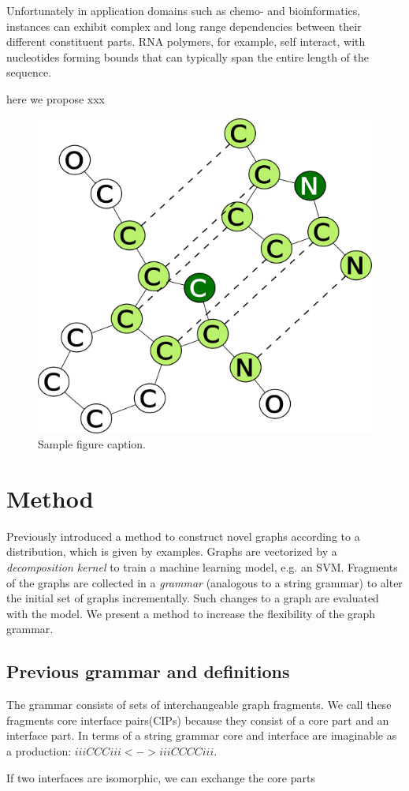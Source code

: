\documentclass{article}
\begin{document}
Unfortunately in application domains such as chemo- and bioinformatics,
instances can exhibit complex and long range dependencies between their
different constituent parts. RNA polymers, for example, self interact, with
nucleotides forming bounds that can typically span the entire length of the
sequence.

here we propose xxx

% 
\begin{figure}[ht]
      \centering
        \includegraphics[width=0.2\linewidth]{images/showcip.png}
      \caption{Sample figure caption.}
      \label{alabal}
\end{figure}

\section{Method}
Previously \cite{costa16} introduced a method
to construct novel graphs according to a distribution, which is given by
examples. Graphs are vectorized by a \emph{decomposition kernel}
to train a machine learning model, e.g. an SVM.
Fragments of the graphs are collected in 
a \emph{grammar} (analogous to a string grammar) to alter the initial
set of graphs incrementally. Such changes to a graph are evaluated with the
model. 
We present a method to increase the flexibility of the graph grammar.

\subsection{Previous grammar and definitions}

The grammar consists of sets of interchangeable graph fragments.
We call these fragments core interface pairs(CIPs) because 
they consist of a core part and an interface part.
In terms of a string grammar core and interface are imaginable 
as a production: $iiiCCCiii <-> iiiCCCCiii$. 

If two interfaces are isomorphic, we can exchange the core parts
\end{document}
